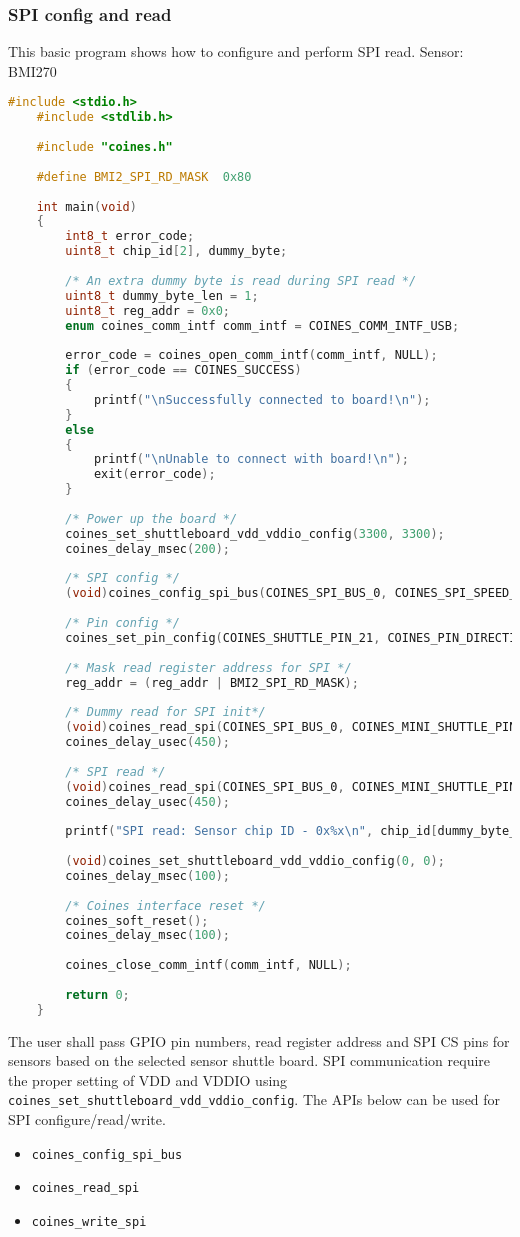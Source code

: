 \documentclass{article}
\begin{document}
\subsubsection{SPI config and read}
This basic program shows how to configure and perform SPI read.
\newline Sensor: BMI270
\begin{lstlisting}[language=c]
	#include <stdio.h>
	#include <stdlib.h>
	
	#include "coines.h"
	
	#define BMI2_SPI_RD_MASK  0x80
	
	int main(void)
	{
		int8_t error_code;
		uint8_t chip_id[2], dummy_byte;
	
		/* An extra dummy byte is read during SPI read */
		uint8_t dummy_byte_len = 1;
		uint8_t reg_addr = 0x0;
		enum coines_comm_intf comm_intf = COINES_COMM_INTF_USB;
	
		error_code = coines_open_comm_intf(comm_intf, NULL);
		if (error_code == COINES_SUCCESS)
		{
			printf("\nSuccessfully connected to board!\n");
		}
		else
		{
			printf("\nUnable to connect with board!\n");
			exit(error_code);
		}
	
		/* Power up the board */
		coines_set_shuttleboard_vdd_vddio_config(3300, 3300);
		coines_delay_msec(200);
	
		/* SPI config */
		(void)coines_config_spi_bus(COINES_SPI_BUS_0, COINES_SPI_SPEED_5_MHZ, COINES_SPI_MODE3);
	
		/* Pin config */
		coines_set_pin_config(COINES_SHUTTLE_PIN_21, COINES_PIN_DIRECTION_OUT, COINES_PIN_VALUE_HIGH);
	
		/* Mask read register address for SPI */
		reg_addr = (reg_addr | BMI2_SPI_RD_MASK);
	
		/* Dummy read for SPI init*/
		(void)coines_read_spi(COINES_SPI_BUS_0, COINES_MINI_SHUTTLE_PIN_2_1, reg_addr, &dummy_byte, 1);
		coines_delay_usec(450);
	
		/* SPI read */
		(void)coines_read_spi(COINES_SPI_BUS_0, COINES_MINI_SHUTTLE_PIN_2_1, reg_addr, chip_id, 1 + dummy_byte_len);
		coines_delay_usec(450);
	
		printf("SPI read: Sensor chip ID - 0x%x\n", chip_id[dummy_byte_len]);
	
		(void)coines_set_shuttleboard_vdd_vddio_config(0, 0);
		coines_delay_msec(100);
	
		/* Coines interface reset */
		coines_soft_reset();
		coines_delay_msec(100);
	
		coines_close_comm_intf(comm_intf, NULL);
	
		return 0;
	}
\end{lstlisting}
The user shall pass GPIO pin numbers, read register address and SPI CS pins for sensors based on the selected sensor shuttle board. SPI communication require the proper setting of VDD and VDDIO using \texttt{coines\_set\_shuttleboard\_vdd\_vddio\_config}.
The APIs below can be used for SPI configure/read/write.
\begin{itemize}
	\item \texttt{coines\_config\_spi\_bus}
	\item \texttt{coines\_read\_spi}
	\item \texttt{coines\_write\_spi}
\end{itemize}
\end{document}
